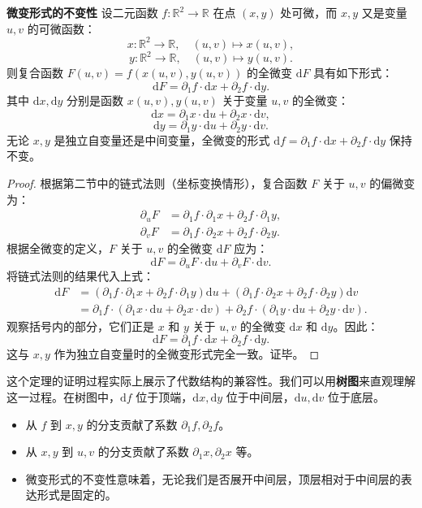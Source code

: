 \documentclass[12pt,UTF8]{ctexbook}
\begin{document}
\begin{tm}{\textbf{微变形式的不变性}}
设二元函数 $f: \mathbb{R}^2 \to \mathbb{R}$ 在点 $(x, y)$ 处可微，而 $x, y$ 又是变量 $u, v$ 的可微函数：
$$ x: \mathbb{R}^2 \to \mathbb{R}, \quad (u, v) \mapsto x(u, v), $$
$$ y: \mathbb{R}^2 \to \mathbb{R}, \quad (u, v) \mapsto y(u, v). $$
则复合函数 $F(u, v) = f(x(u, v), y(u, v))$ 的全微变 $\mathrm{d}F$ 具有如下形式：
$$ \mathrm{d}F = \partial_1 f \cdot \mathrm{d}x + \partial_2 f \cdot \mathrm{d}y. $$
其中 $\mathrm{d}x, \mathrm{d}y$ 分别是函数 $x(u, v), y(u, v)$ 关于变量 $u, v$ 的全微变：
$$ \mathrm{d}x = \partial_1 x \cdot \mathrm{d}u + \partial_2 x \cdot \mathrm{d}v, $$
$$ \mathrm{d}y = \partial_1 y \cdot \mathrm{d}u + \partial_2 y \cdot \mathrm{d}v. $$
无论 $x, y$ 是独立自变量还是中间变量，全微变的形式 $\mathrm{d}f = \partial_1 f \cdot \mathrm{d}x + \partial_2 f \cdot \mathrm{d}y$ 保持不变。
\end{tm}
\begin{proof}
根据第二节中的链式法则（坐标变换情形），复合函数 $F$ 关于 $u, v$ 的偏微变为：
\begin{align*}
\partial_u F &= \partial_1 f \cdot \partial_1 x + \partial_2 f \cdot \partial_1 y, \\
\partial_v F &= \partial_1 f \cdot \partial_2 x + \partial_2 f \cdot \partial_2 y.
\end{align*}
根据全微变的定义，$F$ 关于 $u, v$ 的全微变 $\mathrm{d}F$ 应为：
$$ \mathrm{d}F = \partial_u F \cdot \mathrm{d}u + \partial_v F \cdot \mathrm{d}v. $$
将链式法则的结果代入上式：
\begin{align*}
\mathrm{d}F &= (\partial_1 f \cdot \partial_1 x + \partial_2 f \cdot \partial_1 y) \mathrm{d}u + (\partial_1 f \cdot \partial_2 x + \partial_2 f \cdot \partial_2 y) \mathrm{d}v \\
&= \partial_1 f \cdot (\partial_1 x \cdot \mathrm{d}u + \partial_2 x \cdot \mathrm{d}v) + \partial_2 f \cdot (\partial_1 y \cdot \mathrm{d}u + \partial_2 y \cdot \mathrm{d}v).
\end{align*}
观察括号内的部分，它们正是 $x$ 和 $y$ 关于 $u, v$ 的全微变 $\mathrm{d}x$ 和 $\mathrm{d}y$。因此：
$$ \mathrm{d}F = \partial_1 f \cdot \mathrm{d}x + \partial_2 f \cdot \mathrm{d}y. $$
这与 $x, y$ 作为独立自变量时的全微变形式完全一致。证毕。
\end{proof}

这个定理的证明过程实际上展示了代数结构的兼容性。我们可以用\textbf{树图}来直观理解这一过程。在树图中，$\mathrm{d}f$ 位于顶端，$\mathrm{d}x, \mathrm{d}y$ 位于中间层，$\mathrm{d}u, \mathrm{d}v$ 位于底层。
\begin{itemize}
\item 从 $f$ 到 $x, y$ 的分支贡献了系数 $\partial_1 f, \partial_2 f$。
\item 从 $x, y$ 到 $u, v$ 的分支贡献了系数 $\partial_1 x, \partial_2 x$ 等。
\item 微变形式的不变性意味着，无论我们是否展开中间层，顶层相对于中间层的表达形式是固定的。
\end{itemize}
\end{document}
